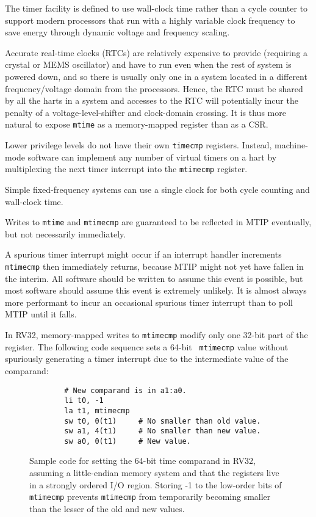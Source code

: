 \begin{commentary}
The timer facility is defined to use wall-clock time rather than a
cycle counter to support modern processors that run with a highly
variable clock frequency to save energy through dynamic voltage and
frequency scaling.

Accurate real-time clocks (RTCs) are relatively expensive to provide
(requiring a crystal or MEMS oscillator) and have to run even when the
rest of system is powered down, and so there is usually only one in a
system located in a different frequency/voltage domain from the
processors.  Hence, the RTC must be shared by all the harts in a
system and accesses to the RTC will potentially incur the penalty of a
voltage-level-shifter and clock-domain crossing.  It is thus more
natural to expose {\tt mtime} as a memory-mapped register than as a CSR.

Lower privilege levels do not have their own {\tt timecmp} registers.
Instead, machine-mode software can implement any number of virtual timers on
a hart by multiplexing the next timer interrupt into the {\tt mtimecmp}
register.

Simple fixed-frequency systems can use a single clock for both cycle
counting and wall-clock time.
\end{commentary}

Writes to {\tt mtime} and {\tt mtimecmp} are guaranteed to be reflected in
MTIP eventually, but not necessarily immediately.

\begin{commentary}
A spurious timer interrupt might occur if an interrupt handler increments {\tt
mtimecmp} then immediately returns, because MTIP might not yet have fallen in
the interim.  All software should be written to assume this event is possible,
but most software should assume this event is extremely unlikely.  It is
almost always more performant to incur an occasional spurious timer interrupt
than to poll MTIP until it falls.
\end{commentary}

In RV32, memory-mapped writes to {\tt mtimecmp} modify only one 32-bit
part of the register.  The following code sequence sets a 64-bit {\tt
  mtimecmp} value without spuriously generating a timer interrupt due
to the intermediate value of the comparand:

\begin{figure}[h!]
\begin{center}
\begin{verbatim}
        # New comparand is in a1:a0.
        li t0, -1
        la t1, mtimecmp
        sw t0, 0(t1)     # No smaller than old value.
        sw a1, 4(t1)     # No smaller than new value.
        sw a0, 0(t1)     # New value.
\end{verbatim}
\end{center}
\caption{Sample code for setting the 64-bit time comparand in RV32, assuming
  a little-endian memory system and that the registers live in a strongly
  ordered I/O region.  Storing -1 to the low-order bits of {\tt mtimecmp}
  prevents {\tt mtimecmp} from temporarily becoming smaller than the lesser
  of the old and new values.}
\label{mtimecmph}
\end{figure}

